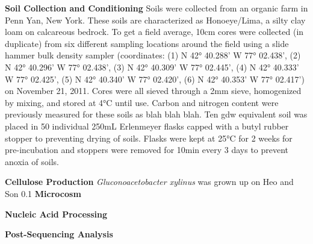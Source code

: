 \textbf{Soil Collection and Conditioning}
Soils were collected from an organic farm in Penn Yan, New York.  These soils are characterized as Honoeye/Lima, a silty clay loam on calcareous bedrock.  To get a field average, 10cm cores were collected (in duplicate) from six different sampling locations around the field using a slide hammer bulk density sampler (coordinates: (1) N 42° 40.288’ W 77° 02.438’, (2) N 42° 40.296’ W 77° 02.438’, (3) N 42° 40.309’ W 77° 02.445’, (4) N 42° 40.333’ W 77° 02.425’, (5) N 42° 40.340’ W 77° 02.420’, (6) N 42° 40.353’ W 77° 02.417’) on November 21, 2011.   Cores were all sieved through a 2mm sieve, homogenized by mixing, and stored at 4°C until use.  Carbon and nitrogen content were previously measured for these soils as blah blah blah.  Ten gdw equivalent soil was placed in 50 individual 250mL Erlenmeyer flasks capped with a butyl rubber stopper to preventing drying of soils.  Flasks were kept at 25°C for 2 weeks for pre-incubation and stoppers were removed for 10min every 3 days to prevent anoxia of soils.   



\textbf{Cellulose Production}
\textit{Gluconoacetobacter xylinus} was grown up on Heo and Son 0.1%
\textbf{Microcosm}

\textbf{Nucleic Acid Processing}

\textbf{Post-Sequencing Analysis}